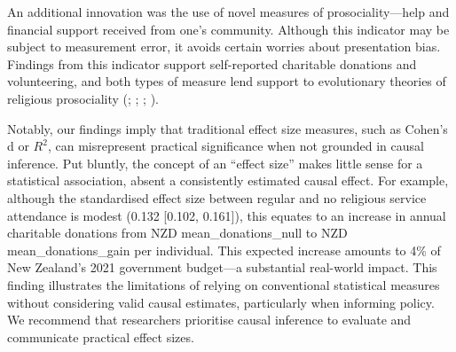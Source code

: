 \documentclass[
  single column]{article}
\begin{document}
An additional innovation was the use of novel measures of
prosociality---help and financial support received from one's community.
Although this indicator may be subject to measurement error, it avoids
certain worries about presentation bias. Findings from this indicator
support self-reported charitable donations and volunteering, and both
types of measure lend support to evolutionary theories of religious
prosociality (; ;
;
).

Notably, our findings imply that traditional effect size measures, such
as Cohen's d or \(R^2\), can misrepresent practical significance when
not grounded in causal inference. Put bluntly, the concept of an
``effect size'' makes little sense for a statistical association, absent
a consistently estimated causal effect. For example, although the
standardised effect size between regular and no religious service
attendance is modest (0.132 {[}0.102, 0.161{]}), this equates to an
increase in annual charitable donations from NZD mean\_donations\_null
to NZD mean\_donations\_gain per individual. This expected increase
amounts to 4\% of New Zealand's 2021 government budget---a substantial
real-world impact. This finding illustrates the limitations of relying
on conventional statistical measures without considering valid causal
estimates, particularly when informing policy. We recommend that
researchers prioritise causal inference to evaluate and communicate
practical effect sizes.
\end{document}
